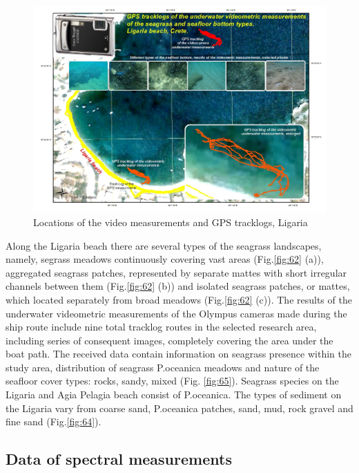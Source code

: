 \documentclass[10pt, a4paper]{article}
\begin{document}
\begin{figure}[h]
\centering
\includegraphics[scale=0.40]{Fig-21.jpg}
\caption{Locations of the video measurements and GPS tracklogs, Ligaria}
\label{fig:21}
\end{figure}

Along the Ligaria beach there are several types of the seagrass landscapes, namely, segrass meadows
continuously covering vast areas (Fig.\ref{fig:62} (a)), aggregated seagrass patches, represented by separate mattes with short irregular channels between them (Fig.\ref{fig:62} (b)) and isolated seagrass patches, or mattes,
which located separately from broad meadows (Fig.\ref{fig:62} (c)).
The results of the underwater videometric measurements of the Olympus cameras made during the
ship route include nine total tracklog routes in the selected research area, including series of
consequent images, completely covering the area under the boat path. The received data contain
information on seagrass presence within the study area, distribution of seagrass P.oceanica meadows
and nature of the seafloor cover types: rocks, sandy, mixed (Fig. \ref{fig:65}). Seagrass species on the Ligaria and Agia
Pelagia beach consist of P.oceanica. The types of sediment on the Ligaria vary from coarse sand,
P.oceanica patches, sand, mud, rock gravel and fine sand (Fig.\ref{fig:64}).

\subsection{Data of spectral measurements}
\end{document}
